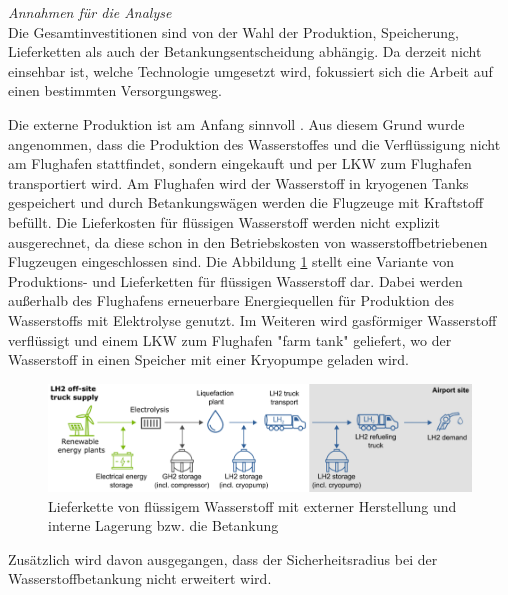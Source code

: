 \textit{Annahmen für die Analyse}\\
Die Gesamtinvestitionen sind von der Wahl der Produktion, Speicherung, 
Lieferketten als auch der Betankungsentscheidung abhängig.
Da derzeit nicht einsehbar ist, welche Technologie umgesetzt wird, 
fokussiert sich die Arbeit auf einen bestimmten Versorgungsweg.

Die externe Produktion ist am Anfang sinnvoll \cite{colpan2022fuel}. 
Aus diesem Grund wurde angenommen, dass die Produktion des Wasserstoffes 
und die Verflüssigung nicht am Flughafen stattfindet, 
sondern eingekauft und per LKW zum Flughafen transportiert wird.
Am Flughafen wird der Wasserstoff in kryogenen Tanks gespeichert 
und durch Betankungswägen werden die Flugzeuge mit Kraftstoff befüllt.
%
Die Lieferkosten für flüssigen Wasserstoff  werden nicht explizit ausgerechnet,
da diese schon in den Betriebskosten von wasserstoffbetriebenen Flugzeugen eingeschlossen sind.
Die Abbildung \ref{supply_wasserstoff} stellt eine Variante von Produktions- und Lieferketten für flüssigen Wasserstoff dar.
Dabei werden außerhalb des Flughafens erneuerbare Energiequellen für Produktion des Wasserstoffs mit Elektrolyse genutzt.
Im Weiteren wird gasförmiger Wasserstoff verflüssigt und einem LKW zum Flughafen "farm tank" geliefert, wo der Wasserstoff
in einen Speicher mit einer Kryopumpe geladen wird.
\begin{figure}[h]
	\centering
	\includegraphics[width=0.9\linewidth]{Bilder/Supply_hydrogen.png}
	\caption[Lieferkette von flüssigem Wasserstoff mit externer Herstellung und interner Lagerung bzw. die Betankung]{Lieferkette von flüssigem Wasserstoff mit externer Herstellung und interne Lagerung bzw. die Betankung \cite{schenke2024lh2}}
	\label{supply_wasserstoff}
\end{figure}

Zusätzlich wird davon ausgegangen, dass der Sicherheitsradius bei der Wasserstoffbetankung nicht erweitert wird.
